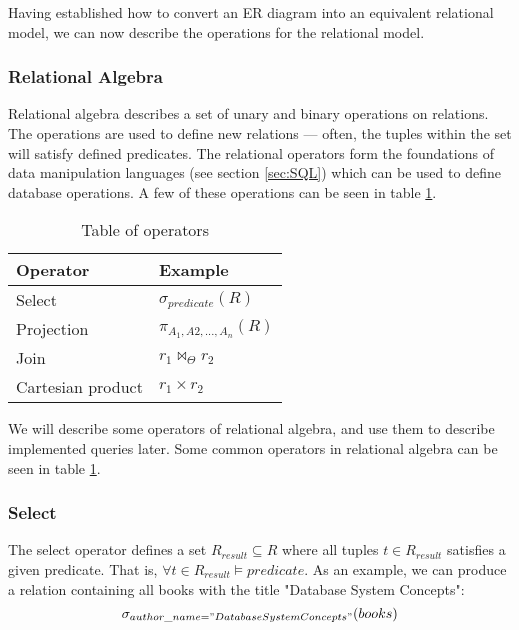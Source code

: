 
Having established how to convert an ER diagram into an equivalent relational model, we can now describe the operations for the relational model.

\subsubsection{Relational Algebra}\label{sec:relationalAlgebra}
Relational algebra describes a set of unary and binary operations on relations.
The operations are used to define new relations --- often, the tuples within the set will satisfy defined predicates.
The relational operators form the foundations of data manipulation languages (see section \ref{sec:SQL}) which can be used to define database operations\cite{DBSBook}.
A few of these operations can be seen in table \ref{Relational algebra operators}.


\begin{table}[h]
    \centering
    \begin{tabular}{|ll|}
    \hline 
    \multicolumn{1}{|l|}{\textbf{Operator}}          & \multicolumn{1}{l|}{\textbf{Example}}   \\ \hline
    \multicolumn{1}{|l|}{Select}                     & \multicolumn{1}{l|}{$\sigma_{predicate}(R)$}            \\ \hline
    \multicolumn{1}{|l|}{Projection}                 & \multicolumn{1}{l|}{$\pi_{A_1, A2,...,A_n}(R)$}           \\ \hline
    \multicolumn{1}{|l|}{Join}                 & \multicolumn{1}{l|}{$r_1 \Join_\Theta r_2$}             \\ \hline
    \multicolumn{1}{|l|}{Cartesian product}          & \multicolumn{1}{l|}{$r_1\times r_2$}              \\ \hline
    \end{tabular}
    \caption{Table of operators}
    \label{Relational algebra operators}
\end{table}

We will describe some operators of relational algebra, and use them to describe implemented queries later.
Some common operators in relational algebra can be seen in table \ref{Relational algebra operators}.
\subsubsection*{Select}
The select operator defines a set $R_{result}\subseteq R$ where all tuples $t \in R_{result}$ satisfies a given predicate\cite{DBSBook}.
That is, $\forall t \in R_{result} \vDash predicate$.
As an example, we can produce a relation containing all books with the title "Database System Concepts":
$$\sigma_{author\_name = "Database System Concepts"}(books)$$
